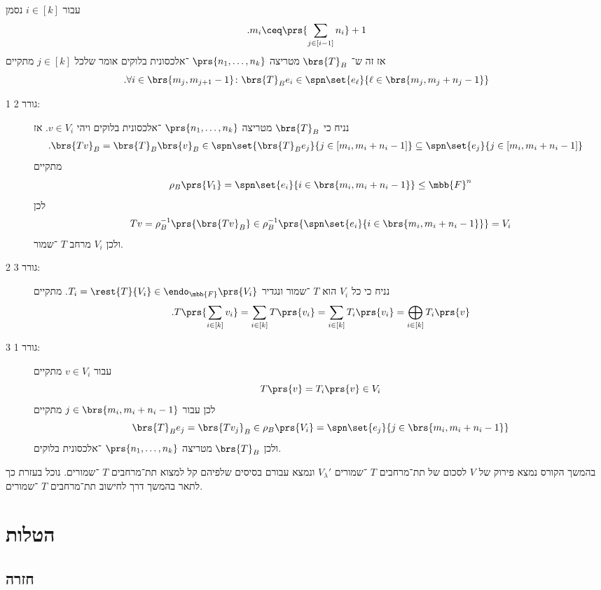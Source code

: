 \documentclass[a4paper,10pt,oneside,openany]{article}
\begin{document}
\begin{solution}
 עבור
$i \in [k]$
 נסמן
\[\text{.} m_i \ceq \prs{\sum_{j \in [i-1]} n_i} + 1\]
אז זה ש־%
$\brs{T}_B$
מטריצה
$\prs{n_1, \ldots, n_k}$%
־אלכסונית בלוקים אומר שלכל
$j \in [k]$
מתקיים
\[\text{.} \forall i \in \brs{m_j, m_{j+1}-1} \colon \brs{T}_B e_i \in \spn\set{e_\ell}{\ell \in \brs{m_j, m_j + n_j - 1}}\]
\begin{description}
\item[1 גורר 2:]
נניח כי
$\brs{T}_B$
מטריצה
$\prs{n_1, \ldots, n_k}$%
־אלכסונית בלוקים ויהי
$v \in V_i$.
אז
\begin{align*}
\text{.} \brs{T v}_B &= \brs{T}_B \brs{v}_B \in \spn\set{\brs{T}_B e_j}{j \in [m_i, m_i+n_i-1]} \subseteq \spn\set{e_j}{j \in [m_i, m_i+n_i-1]}
\end{align*}
מתקיים
\[\rho_B\prs{V_1} = \spn\set{e_i}{i \in \brs{m_i, m_i+n_i - 1}} \leq \mbb{F}^n\]
לכן
\[Tv = \rho_B^{-1}\prs{\brs{Tv}_B} \in \rho_B^{-1}\prs{\spn\set{e_i}{i \in \brs{m_i, m_i+n_i-1}}} = V_i\]
ולכן
$V_i$
מרחב
$T$%
־שמור.

\item[2 גורר 3:]
נניח כי כל
$V_i$
הוא
$T$%
־שמור ונגדיר
$T_i = \rest{T}{V_i} \in \endo_{\mbb{F}}\prs{V_i}$.
מתקיים
\[\text{.} T\prs{\sum_{i \in [k]} v_i} = \sum_{i \in [k]} T\prs{v_i} = \sum_{i \in [k]} T_i\prs{v_i} = \bigoplus_{i \in [k]} T_i\prs{v}\]

\item[3 גורר 1:]
עבור
$v \in V_i$
מתקיים
\[T\prs{v} = T_i\prs{v} \in V_i\]
לכן עבור
$j \in \brs{m_i, m_i+n_i - 1}$
מתקיים
\[\brs{T}_B e_j = \brs{T v_j}_B \in \rho_B\prs{V_i} = \spn\set{e_j}{j \in \brs{m_i, m_i+n_i-1}}\]
ולכן
$\brs{T}_B$
מטריצה
$\prs{n_1, \ldots, n_k}$%
־אלכסונית בלוקים.
\end{description}
\end{solution}

\begin{remark}
בהמשך הקורס נמצא פירוק של
$V$
לסכום של תת־מרחבים
$T$%
־שמורים
$V_{\lambda}'$
ונמצא עבורם בסיסים שלפיהם קל למצוא תת־מרחבים
$T$%
־שמורים.
נוכל בעזרת כך לתאר בהמשך דרך לחישוב תת־מרחבים
$T$%
־שמורים.
\end{remark}

\section{הטלות}

\subsection{חזרה}
\end{document}
